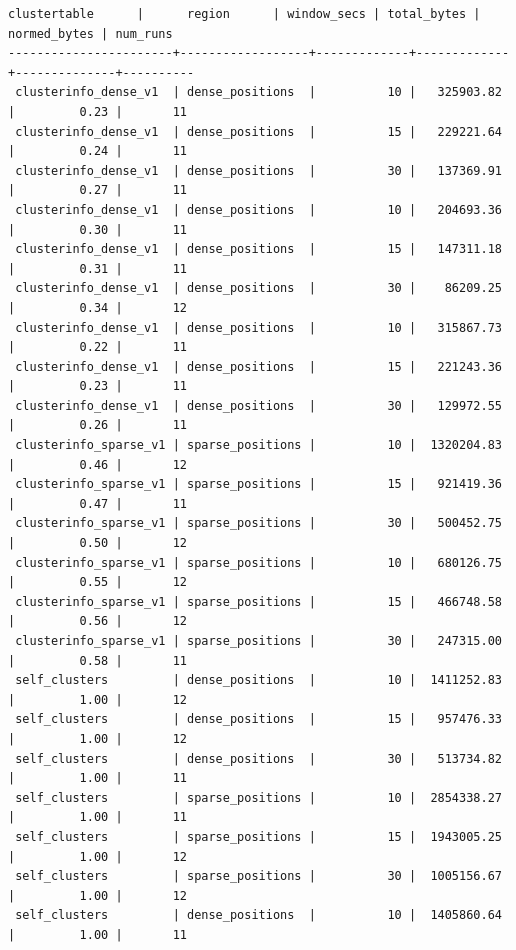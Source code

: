 \documentclass{thesis}
\begin{document}
   \begin{table}
       \begin{Verbatim}[fontsize=\scriptsize]
     clustertable      |      region      | window_secs | total_bytes | normed_bytes | num_runs
-----------------------+------------------+-------------+-------------+--------------+----------
 clusterinfo_dense_v1  | dense_positions  |          10 |   325903.82 |         0.23 |       11
 clusterinfo_dense_v1  | dense_positions  |          15 |   229221.64 |         0.24 |       11
 clusterinfo_dense_v1  | dense_positions  |          30 |   137369.91 |         0.27 |       11
 clusterinfo_dense_v1  | dense_positions  |          10 |   204693.36 |         0.30 |       11
 clusterinfo_dense_v1  | dense_positions  |          15 |   147311.18 |         0.31 |       11
 clusterinfo_dense_v1  | dense_positions  |          30 |    86209.25 |         0.34 |       12
 clusterinfo_dense_v1  | dense_positions  |          10 |   315867.73 |         0.22 |       11
 clusterinfo_dense_v1  | dense_positions  |          15 |   221243.36 |         0.23 |       11
 clusterinfo_dense_v1  | dense_positions  |          30 |   129972.55 |         0.26 |       11
 clusterinfo_sparse_v1 | sparse_positions |          10 |  1320204.83 |         0.46 |       12
 clusterinfo_sparse_v1 | sparse_positions |          15 |   921419.36 |         0.47 |       11
 clusterinfo_sparse_v1 | sparse_positions |          30 |   500452.75 |         0.50 |       12
 clusterinfo_sparse_v1 | sparse_positions |          10 |   680126.75 |         0.55 |       12
 clusterinfo_sparse_v1 | sparse_positions |          15 |   466748.58 |         0.56 |       12
 clusterinfo_sparse_v1 | sparse_positions |          30 |   247315.00 |         0.58 |       11
 self_clusters         | dense_positions  |          10 |  1411252.83 |         1.00 |       12
 self_clusters         | dense_positions  |          15 |   957476.33 |         1.00 |       12
 self_clusters         | dense_positions  |          30 |   513734.82 |         1.00 |       11
 self_clusters         | sparse_positions |          10 |  2854338.27 |         1.00 |       11
 self_clusters         | sparse_positions |          15 |  1943005.25 |         1.00 |       12
 self_clusters         | sparse_positions |          30 |  1005156.67 |         1.00 |       12
 self_clusters         | dense_positions  |          10 |  1405860.64 |         1.00 |       11

\end{Verbatim}
\end{table}
\end{document}
